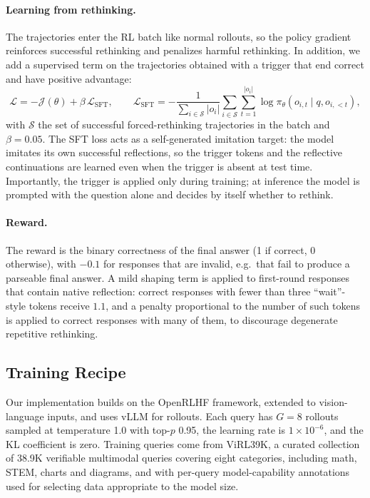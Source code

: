\documentclass{article}
\begin{document}
\paragraph{Learning from rethinking.} The trajectories enter the RL batch like normal rollouts, so the policy gradient reinforces successful rethinking and penalizes harmful rethinking. In addition, we add a supervised term on the trajectories obtained with a trigger that end correct and have positive advantage:
\begin{equation}
\mathcal{L}=-\mathcal{J}(\theta)+\beta\,\mathcal{L}_\text{SFT},\qquad
\mathcal{L}_\text{SFT}=-\frac{1}{\sum_{i\in\mathcal{S}}|o_i|}\sum_{i\in\mathcal{S}}\sum_{t=1}^{|o_i|}\log\pi_\theta(o_{i,t}\mid q,o_{i,<t}),
\end{equation}
with $\mathcal{S}$ the set of successful forced-rethinking trajectories in the batch and $\beta=0.05$. The SFT loss acts as a self-generated imitation target: the model imitates its own successful reflections, so the trigger tokens and the reflective continuations are learned even when the trigger is absent at test time. Importantly, the trigger is applied only during training; at inference the model is prompted with the question alone and decides by itself whether to rethink.

\paragraph{Reward.} The reward is the binary correctness of the final answer (1 if correct, 0 otherwise), with $-0.1$ for responses that are invalid, e.g.\ that fail to produce a parseable final answer. A mild shaping term is applied to first-round responses that contain native reflection: correct responses with fewer than three ``wait''-style tokens receive $1.1$, and a penalty proportional to the number of such tokens is applied to correct responses with many of them, to discourage degenerate repetitive rethinking.

\subsection{Training Recipe}
Our implementation builds on the OpenRLHF framework, extended to vision-language inputs, and uses vLLM for rollouts. Each query has $G=8$ rollouts sampled at temperature 1.0 with top-$p$ 0.95, the learning rate is $1\times10^{-6}$, and the KL coefficient is zero. Training queries come from ViRL39K, a curated collection of 38.9K verifiable multimodal queries covering eight categories, including math, STEM, charts and diagrams, and with per-query model-capability annotations used for selecting data appropriate to the model size.
\end{document}
